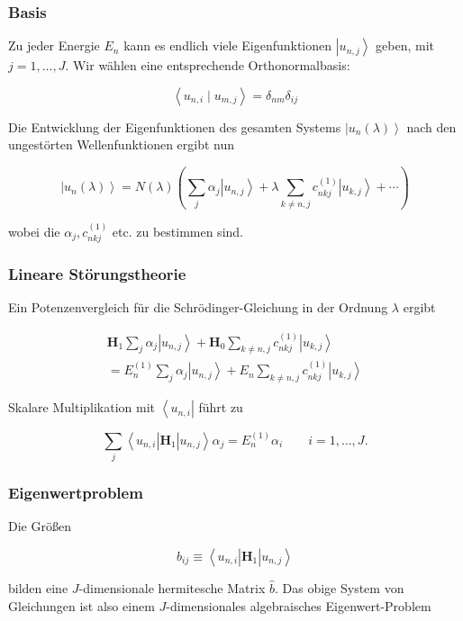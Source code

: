 \documentclass[10pt, letterpaper]{article}
\begin{document}
\subsubsection*{Basis}
Zu jeder Energie $E_{n}$ kann es endlich viele Eigenfunktionen $\left|u_{n, j}\right\rangle$ geben, mit $j=1, \ldots, J$. Wir wählen eine entsprechende Orthonormalbasis:

$$
\left\langle u_{n, i} \mid u_{m, j}\right\rangle=\delta_{n m} \delta_{i j}
$$

Die Entwicklung der Eigenfunktionen des gesamten Systems $\left|u_{n}(\lambda)\right\rangle$ nach den ungestörten Wellenfunktionen ergibt nun

$$
\left|u_{n}(\lambda)\right\rangle=N(\lambda)\left(\sum_{j} \alpha_{j}\left|u_{n, j}\right\rangle+\lambda \sum_{k \neq n, j} c_{n k j}^{(1)}\left|u_{k, j}\right\rangle+\cdots\right)
$$

wobei die $\alpha_{j}, c_{n k j}^{(1)}$ etc. zu bestimmen sind.

\subsubsection*{Lineare Störungstheorie}
Ein Potenzenvergleich für die Schrödinger-Gleichung in der Ordnung $\lambda$ ergibt

$$
\begin{array}{r}
\mathbf{H}_{1} \sum_{j} \alpha_{j}\left|u_{n, j}\right\rangle+\mathbf{H}_{0} \sum_{k \neq n, j} c_{n k j}^{(1)}\left|u_{k, j}\right\rangle \\
=E_{n}^{(1)} \sum_{j} \alpha_{j}\left|u_{n, j}\right\rangle+E_{n} \sum_{k \neq n, j} c_{n k j}^{(1)}\left|u_{k, j}\right\rangle
\end{array}
$$

Skalare Multiplikation mit $\left\langle u_{n, i}\right|$ führt zu

$$
\sum_{j}\left\langle u_{n, i}\right| \mathbf{H}_{1}\left|u_{n, j}\right\rangle \alpha_{j}=E_{n}^{(1)} \alpha_{i} \quad \quad i=1, \ldots, J .
$$

\subsubsection*{Eigenwertproblem}
Die Größen

$$
b_{i j} \equiv\left\langle u_{n, i}\right| \mathbf{H}_{1}\left|u_{n, j}\right\rangle
$$

bilden eine $J$-dimensionale hermitesche Matrix $\hat{b}$. Das obige System von Gleichungen ist also einem $J$-dimensionales algebraisches Eigenwert-Problem
\end{document}
